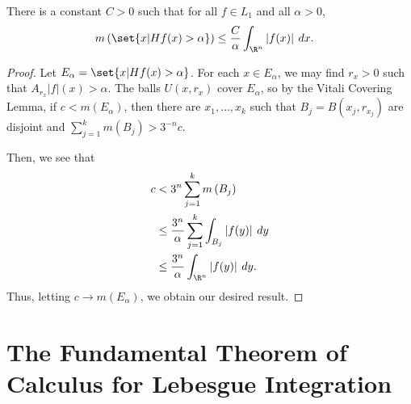 \documentclass[10pt]{mypackage}
\begin{document}
\begin{theorem}
  There is a constant $C > 0$ such that for all $f\in L_1$ and all $\alpha > 0$,
  \begin{align*}
    m\left( \set{x | Hf(x) > \alpha} \right) &\leq \frac{C}{\alpha} \int_{\R^n}^{} \left\vert f(x) \right\vert\:dx.
  \end{align*}
\end{theorem}
\begin{proof}
  Let $E_{\alpha} = \set{x | Hf(x) > \alpha}$. For each $x\in E_{\alpha}$, we may find $r_x > 0$ such that $A_{r_x}\left\vert f \right\vert(x) > \alpha$. The balls $U\left( x,r_x \right)$ cover $E_{\alpha}$, so by the Vitali Covering Lemma, if $c < m\left( E_{\alpha} \right)$, then there are $x_1,\dots,x_k$ such that $B_j = B\left( x_j,r_{x_j} \right)$ are disjoint and $\sum_{j=1}^{k}m\left( B_j \right) > 3^{-n}c$.\newline

  Then, we see that
  \begin{align*}
    c &< 3^{n}\sum_{j=1}^{k} m\left( B_j \right)\\
      &\leq \frac{3^{n}}{\alpha} \sum_{j=1}^{k} \int_{B_j}^{} \left\vert f(y) \right\vert\:dy\\
      &\leq \frac{3^{n}}{\alpha} \int_{\R^{n}}^{} \left\vert f(y) \right\vert\:dy.
  \end{align*}
  Thus, letting $c \rightarrow m\left( E_{\alpha} \right)$, we obtain our desired result.
\end{proof}
\section{The Fundamental Theorem of Calculus for Lebesgue Integration}%
\end{document}
